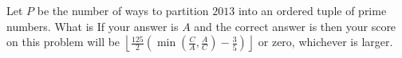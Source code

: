 Let $P$ be the number of ways to partition $2013$ into an ordered tuple of prime numbers.  What is   If your answer is $A$ and the correct answer is  then your score on this problem will be $\left\lfloor\frac{125}2\left(\min\left(\frac CA,\frac AC\right)-\frac35\right)\right\rfloor$ or zero, whichever is larger.